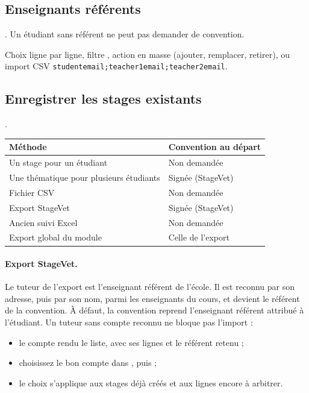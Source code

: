 \documentclass[11pt,a4paper]{article}
\begin{document}
\subsection{Enseignants référents}
\label{sec:referents}

. Un étudiant sans
référent ne peut pas demander de convention.


Choix ligne par ligne, filtre ,
action en masse (ajouter, remplacer, retirer), ou import CSV
\texttt{studentemail;teacher1email;teacher2email}.

\subsection{Enregistrer les stages existants}
\label{sec:enregistrement}

.

\begin{center}
\begin{tabularx}{\linewidth}{@{}X l@{}}
\toprule
\textbf{Méthode} & \textbf{Convention au départ} \\
\midrule
Un stage pour un étudiant & Non demandée \\
Une thématique pour plusieurs étudiants & Signée (StageVet) \\
Fichier CSV & Non demandée \\
Export StageVet & Signée (StageVet) \\
Ancien suivi Excel & Non demandée \\
Export global du module & Celle de l'export \\
\bottomrule
\end{tabularx}
\end{center}


\paragraph{Export StageVet.} Le \og tuteur\fg{} de l'export est l'enseignant
référent de l'école. Il est reconnu par son adresse, puis par son nom, parmi les
enseignants du cours, et devient le référent de la convention. À défaut, la
convention reprend l'enseignant référent attribué à l'étudiant. Un tuteur sans
compte reconnu ne bloque pas l'import :
\begin{itemize}
  \item le compte rendu le liste, avec ses lignes et le référent retenu ;
  \item choisissez le bon compte dans , puis
     ;
  \item le choix s'applique aux stages déjà créés et aux lignes encore à
    arbitrer.
\end{itemize}
\end{document}
